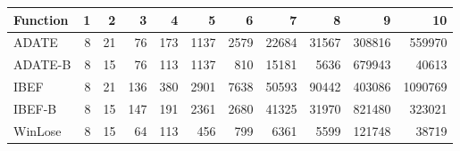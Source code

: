 \begin{table}[ht]
\centering
\begin{tabular}{lrrrrrrrrrr}
  \hline
Function & 1 & 2 & 3 & 4 & 5 & 6 & 7 & 8 & 9 & 10 \\ 
  \hline
ADATE &   8 &  21 &  76 & 173 & 1137 & 2579 & 22684 & 31567 & 308816 & 559970 \\ 
  ADATE-B &   8 &  15 &  76 & 113 & 1137 & 810 & 15181 & 5636 & 679943 & 40613 \\ 
  IBEF &   8 &  21 & 136 & 380 & 2901 & 7638 & 50593 & 90442 & 403086 & 1090769 \\ 
  IBEF-B &   8 &  15 & 147 & 191 & 2361 & 2680 & 41325 & 31970 & 821480 & 323021 \\ 
  WinLose &   8 &  15 &  64 & 113 & 456 & 799 & 6361 & 5599 & 121748 & 38719 \\ 
   \hline
\end{tabular}
\end{table}
